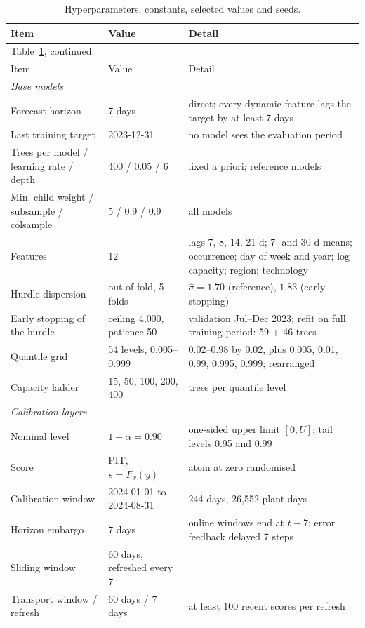 \begin{longtable}{p{} p{} p{}}
\caption{Hyperparameters, constants, selected values and seeds.}\label{tab:hiper}\\
\toprule
Item & Value & Detail \\
\midrule
\endfirsthead
\multicolumn{3}{l}{\footnotesize Table~\ref{tab:hiper}, continued.}\\
\toprule
Item & Value & Detail \\
\midrule
\endhead
\bottomrule
\endlastfoot
\textit{Base models} &  &  \\
Forecast horizon & 7 days & direct; every dynamic feature lags the target by at least 7 days \\
Last training target & 2023-12-31 & no model sees the evaluation period \\
Trees per model / learning rate / depth & 400 / 0.05 / 6 & fixed a priori; reference models \\
Min. child weight / subsample / colsample & 5 / 0.9 / 0.9 & all models \\
Features & 12 & lags 7, 8, 14, 21 d; 7- and 30-d means; occurrence; day of week and year; log capacity; region; technology \\
Hurdle dispersion & out of fold, 5 folds & $\hat\sigma=1.70$ (reference), $1.83$ (early stopping) \\
Early stopping of the hurdle & ceiling 4{,}000, patience 50 & validation Jul--Dec 2023; refit on full training period: 59 + 46 trees \\
Quantile grid & 54 levels, 0.005--0.999 & 0.02--0.98 by 0.02, plus 0.005, 0.01, 0.99, 0.995, 0.999; rearranged \\
Capacity ladder & 15, 50, 100, 200, 400 & trees per quantile level \\
\textit{Calibration layers} &  &  \\
Nominal level & $1-\alpha=0.90$ & one-sided upper limit $[0,U]$; tail levels 0.95 and 0.99 \\
Score & PIT, $s=F_x(y)$ & atom at zero randomised \\
Calibration window & 2024-01-01 to 2024-08-31 & 244 days, 26{,}552 plant-days \\
Horizon embargo & 7 days & online windows end at $t-7$; error feedback delayed 7 steps \\
Sliding window & 60 days, refreshed every 7 &  \\
Transport window / refresh & 60 days / 7 days & at least 100 recent scores per refresh \\

\end{longtable}
